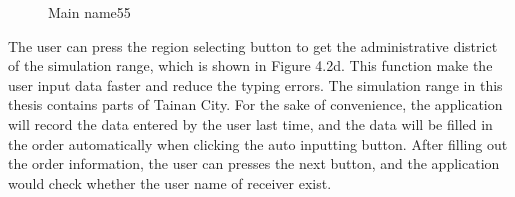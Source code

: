 \documentclass[12pt]{ksthesis}
\begin{document}
\begin{thesis}
{\begin{figure}[H]
\centering  %
\caption{Main name55}
\label{Fig.main}
\end{figure}

The user can press the region selecting button to get the administrative district of the simulation range, which is shown in Figure 4.2d. This function make the user input data faster and reduce the typing errors. The simulation range in this thesis contains parts of Tainan City. For the sake of convenience, the application will record the data entered by the user last time, and the data will be filled in the order automatically when clicking the auto inputting button. After filling out the order information, the user can presses the next button, and the application would check whether the user name of receiver exist. 

}
\end{thesis}
\end{document}
